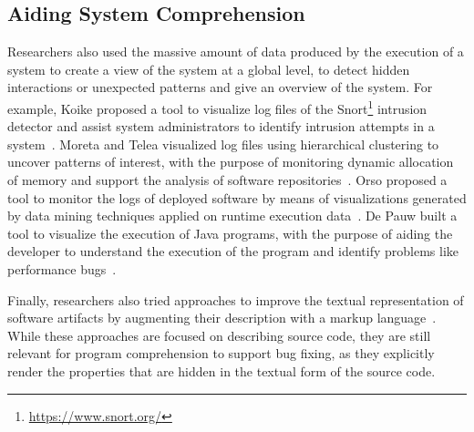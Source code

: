 \subsection{Aiding System Comprehension}

Researchers also used the massive amount of data produced by the execution of a system to create a view of the system at a global level, to detect hidden interactions or unexpected patterns and give an overview of the system.
For example, Koike proposed a tool to visualize log files of the Snort\footnote{\url{https://www.snort.org/}} intrusion detector and assist system administrators to identify intrusion attempts in a system~\cite{Koik2004}.
Moreta and Telea visualized log files using hierarchical clustering to uncover patterns of interest, with the purpose of monitoring dynamic allocation of memory and support the analysis of software repositories~\cite{More2007}.
Orso \etal proposed a tool to monitor the logs of deployed software by means of visualizations generated by data mining techniques applied on runtime execution data~\cite{Orso2003}.
De Pauw \etal built a tool to visualize the execution of Java programs, with the purpose of aiding the developer to understand the execution of the program and identify problems like performance bugs~\cite{De2002}.


Finally, researchers also tried approaches to improve the textual representation of software artifacts by augmenting their description with a markup language~\cite{Badr2000,Male2002a}.
While these approaches are focused on describing source code, they are still relevant for program comprehension to support bug fixing, as they explicitly render the properties that are hidden in the textual form of the source code.







